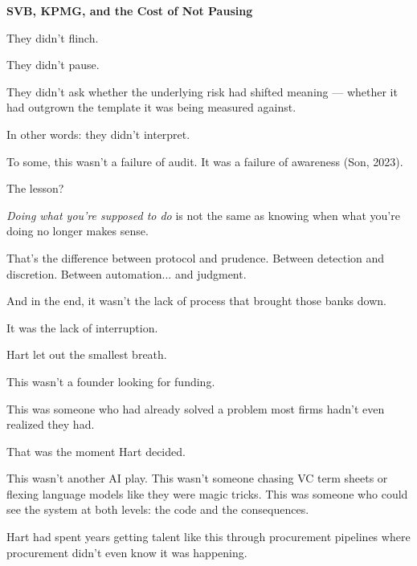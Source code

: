 \begin{HistoricalSidebar}{\textbf{SVB, KPMG, and the Cost of Not Pausing}}
  
  They didn’t flinch.

  \medskip
  
  
  They didn’t pause.

  \medskip
  
  
  They didn’t ask whether the underlying risk had shifted meaning — whether it had outgrown the template 
  it was being measured against.

  \medskip
  
  
  In other words: they didn’t interpret.

  \medskip
  
  
  To some, this wasn’t a failure of audit.
  It was a failure of awareness (Son, 2023).

  \medskip
  
  
  The lesson?

  \medskip
  
  
  \textit{Doing what you’re supposed to do} is not the same as knowing when what you’re doing no 
  longer makes sense.

  \medskip
  
  
  That’s the difference between protocol and prudence.
  Between detection and discretion.
  Between automation... and judgment.

  \medskip
  
  
  And in the end, it wasn’t the lack of process that brought those banks down.

  \medskip
  
  
  It was the lack of interruption.
  
\end{HistoricalSidebar}

\medskip







Hart let out the smallest breath.

This wasn’t a founder looking for funding.

This was someone who had already solved a problem most firms hadn’t even realized they had.

That was the moment Hart decided.

This wasn’t another AI play. 
This wasn’t someone chasing VC term sheets or flexing language models like they were magic tricks. 
This was someone who could see the system at both levels: the code and the consequences.

Hart had spent years getting talent like this through procurement pipelines where procurement didn’t even 
know it was happening.

